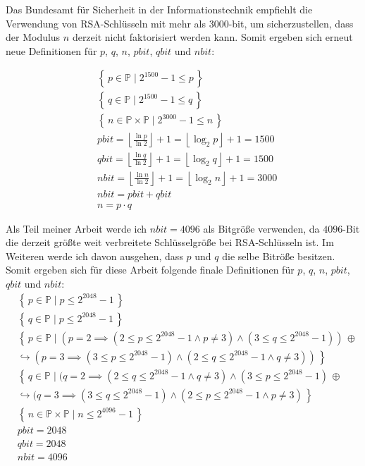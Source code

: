 Das Bundesamt für Sicherheit in der Informationstechnik empfiehlt die Verwendung von RSA-Schlüsseln mit mehr als 3000-bit, um sicherzustellen, dass der Modulus $n$ derzeit nicht faktorisiert werden kann.\cite{bsicrypto} Somit ergeben sich erneut neue Definitionen für $p$, $q$, $n$, $pbit$, $qbit$ und $nbit$:

\begin{equation}
  \begin{split}
    &\left\{\,p \in \mathbb{P}\mid 2^{1500}-1 \le p\, \right\}\\
    &\left\{\,q \in \mathbb{P}\mid 2^{1500}-1 \le q\, \right\}\\
    &\left\{\,n \in \mathbb{P} \times \mathbb{P}\mid 2^{3000}-1 \le n\, \right\}\\
    &pbit=\left\lfloor\frac{\ln{p}}{\ln{2}}\right\rfloor+1=\left\lfloor\log_2{p}\right\rfloor+1=1500\\
    &qbit=\left\lfloor\frac{\ln{q}}{\ln{2}}\right\rfloor+1=\left\lfloor\log_2{q}\right\rfloor+1=1500\\
    &nbit=\left\lfloor\frac{\ln{n}}{\ln{2}}\right\rfloor+1=\left\lfloor\log_2{n}\right\rfloor+1=3000\\
    &nbit=pbit+qbit\\
    &n=p\cdot q
  \end{split}
\end{equation}
\newpage

Als Teil meiner Arbeit werde ich $nbit=4096$ als Bitgröße verwenden, da $4096$-Bit die derzeit größte weit verbreitete Schlüsselgröße bei RSA-Schlüsseln ist. Im Weiteren werde ich davon ausgehen, dass $p$ und $q$ die selbe Bitröße besitzen. Somit ergeben sich für diese Arbeit folgende finale Definitionen für $p$, $q$, $n$, $pbit$, $qbit$ und $nbit$:
\begin{equation}
  \begin{split}
    &\left\{\,p \in \mathbb{P}\mid p \le 2^{2048}-1\, \right\}\\
    &\left\{\,q \in \mathbb{P}\mid p \le 2^{2048}-1\, \right\}\\
    &\left\{\,p \in \mathbb{P}\mid (p=2 \implies (2 \le p \le 2^{2048}-1 \land p \ne 3) \land (3 \le q \le 2^{2048}-1))\, \oplus \right. \\ &\hookrightarrow \left. (p=3 \implies (3 \le p \le 2^{2048}-1) \land (2 \le q \le 2^{2048}-1 \land q \ne 3))\, \right\}\\
    &\left\{\,q \in \mathbb{P}\mid (q=2 \implies (2 \le q \le 2^{2048}-1 \land q \ne 3) \land (3 \le p \le 2^{2048}-1)\, \oplus \right. \\ &\hookrightarrow \left. (q=3 \implies (3 \le q \le 2^{2048}-1) \land (2 \le p \le 2^{2048}-1 \land p \ne 3)\, \right\}\\
    &\left\{\,n \in \mathbb{P} \times \mathbb{P}\mid n \le 2^{4096}-1\, \right\}\\
    &pbit=2048\\
    &qbit=2048\\
    &nbit=4096\\
  \end{split}
\end{equation}
